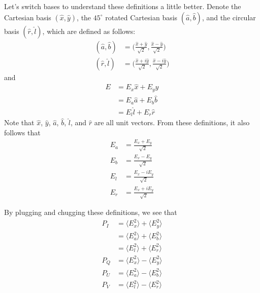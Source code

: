 \documentclass{article}
\begin{document}
Let's switch bases to understand these definitions a little better. Denote the Cartesian basis $(\hat{x},\hat{y})$, the $45^\circ$ rotated Cartesian basis $(\hat{a},\hat{b})$, and the circular basis $(\hat{r},\hat{l})$, which are defined as follows:
\begin{align}
    (\hat{a},\hat{b}) &= \Big(\frac{\hat{x} + \hat{y}}{\sqrt{2}}, \frac{\hat{x} - \hat{y}}{\sqrt{2}} \Big) \\
    (\hat{r},\hat{l}) &= \Big(\frac{\hat{x} + i\hat{y}}{\sqrt{2}}, \frac{\hat{x} - i\hat{y}}{\sqrt{2}} \Big)
\end{align}
and
\begin{align}
    E &= E_x \hat{x} + E_y \hat{y} \\
    &= E_a \hat{a} + E_b \hat{b} \\
    &= E_l \hat{l} + E_r \hat{r}
\end{align}
Note that $\hat{x}$, $\hat{y}$, $\hat{a}$, $\hat{b}$, $\hat{l}$, and $\hat{r}$ are all unit vectors. From these definitions, it also follows that
\begin{align}
    E_a &= \frac{E_x + E_y}{\sqrt{2}} \\
    E_b &= \frac{E_x - E_y}{\sqrt{2}} \\
    E_l &= \frac{E_x - iE_y}{\sqrt{2}} \\
    E_r &= \frac{E_x + iE_y}{\sqrt{2}}
\end{align}

By plugging and chugging these definitions, we see that
\begin{align}
    P_I &= \langle E_x^2 \rangle + \langle E_y^2 \rangle \\ 
        &= \langle E_a^2 \rangle + \langle E_b^2 \rangle \\
        &= \langle E_l^2 \rangle + \langle E_r^2 \rangle \\
    P_Q &= \langle E_x^2 \rangle - \langle E_y^2 \rangle \\
    P_U &= \langle E_a^2 \rangle - \langle E_b^2 \rangle \\
    P_V &= \langle E_l^2 \rangle - \langle E_r^2 \rangle
\end{align}
 
\end{document}
